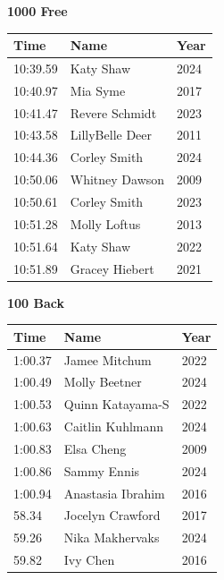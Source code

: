\vspace{1.2em}
\noindent\begin{minipage}[t]{0.48\textwidth}
\centering
\textbf{\textcolor{teamprimary}{1000 Free}}\par
\vspace{0.5em}
\centering
\small
\renewcommand{\arraystretch}{1.0}
\setlength{\tabcolsep}{4pt}
\begin{tabular}{@{}p{1.8cm}p{3.0cm}p{1.0cm}@{}}
\toprule
\textbf{Time} & \textbf{Name} & \textbf{Year} \\
\midrule
10:39.59 & Katy Shaw & 2024 \\
10:40.97 & Mia Syme & 2017 \\
10:41.47 & Revere Schmidt & 2023 \\
10:43.58 & LillyBelle Deer & 2011 \\
10:44.36 & Corley Smith & 2024 \\
10:50.06 & Whitney Dawson & 2009 \\
10:50.61 & Corley Smith & 2023 \\
10:51.28 & Molly Loftus & 2013 \\
10:51.64 & Katy Shaw & 2022 \\
10:51.89 & Gracey Hiebert & 2021 \\
\bottomrule
\end{tabular}
\end{minipage}
\hfill
\begin{minipage}[t]{0.48\textwidth}
\centering
\textbf{\textcolor{teamprimary}{100 Back}}\par
\vspace{0.5em}
\centering
\small
\renewcommand{\arraystretch}{1.0}
\setlength{\tabcolsep}{4pt}
\begin{tabular}{@{}p{1.8cm}p{3.0cm}p{1.0cm}@{}}
\toprule
\textbf{Time} & \textbf{Name} & \textbf{Year} \\
\midrule
1:00.37 & Jamee Mitchum & 2022 \\
1:00.49 & Molly Beetner & 2024 \\
1:00.53 & Quinn Katayama-S & 2022 \\
1:00.63 & Caitlin Kuhlmann & 2024 \\
1:00.83 & Elsa Cheng & 2009 \\
1:00.86 & Sammy Ennis & 2024 \\
1:00.94 & Anastasia Ibrahim & 2016 \\
58.34 & Jocelyn Crawford & 2017 \\
59.26 & Nika Makhervaks & 2024 \\
59.82 & Ivy Chen & 2016 \\
\bottomrule
\end{tabular}
\end{minipage}
